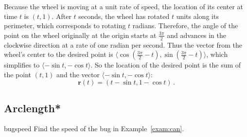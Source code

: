 \documentclass{watsonbook}
\begin{document}
\begin{solution}
  Because the wheel is moving at a unit rate of speed, the location of
  its center at time $t$ is $(t,1)$. After $t$ seconds, the wheel has
  rotated $t$ units along its perimeter, which corresponds to rotating
  $t$ radians. Therefore, the angle of the point on the wheel
  originally at the origin starts at $\tfrac{3\pi}{2}$ and advances in
  the clockwise direction at a rate of one radian per second. Thus the
  vector from the wheel's center to the desired point is
  $\langle \cos\left(\tfrac{3\pi}{2}-t\right),
  \sin\left(\tfrac{3\pi}{2}-t\right)\rangle$, which simplifies to
  $\langle -\sin t, - \cos t \rangle$. So the location of the
  desired point is the sum of the point $(t,1)$ and the vector
  $\langle -\sin t, - \cos t \rangle$:
  \[
    \boxed{\mathbf{r}(t) = (t - \sin t, 1- \cos t)}\,.
  \]
\end{solution}

\subsection{Arclength*} \label{subsec:arclength} 

\begin{example}{}{bugspeed}
  Find the speed of the bug in Example~\ref{exam:can}. 
\end{example}
\end{document}
